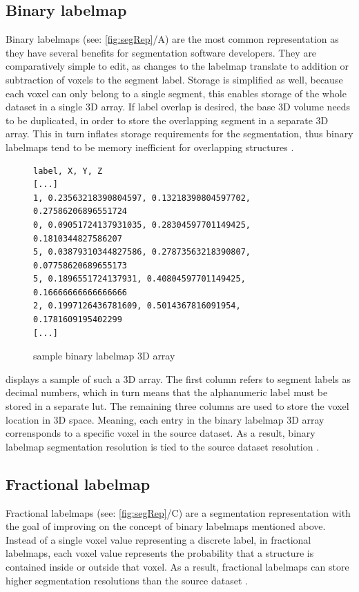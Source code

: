 \subsection{Binary labelmap}\label{s:b-binary-labelmap}
Binary labelmaps (see: \cref{fig:segRep}/A) are the most common representation as they have several benefits for segmentation software developers.
They are comparatively simple to edit, as changes to the labelmap translate to addition or subtraction of voxels to the segment label.
Storage is simplified as well, because each voxel can only belong to a single segment, this enables storage of the whole dataset in a single 3D array.
If label overlap is desired, the base 3D volume needs to be duplicated,
in order to store the overlapping segment in a separate 3D array.
This in turn inflates storage requirements for the segmentation,
thus binary labelmaps tend to be memory inefficient for overlapping structures \cite{slicercommunity3DSlicerImage2022}.
\begin{figure}[h]
	\begin{verbatim}
label, X, Y, Z
[...]
1, 0.23563218390804597, 0.13218390804597702, 0.27586206896551724
0, 0.09051724137931035, 0.28304597701149425, 0.1810344827586207
5, 0.03879310344827586, 0.27873563218390807, 0.07758620689655173
5, 0.1896551724137931, 0.40804597701149425, 0.16666666666666666
2, 0.1997126436781609, 0.5014367816091954, 0.1781609195402299
[...]
\end{verbatim}
	\caption{sample binary labelmap 3D array}\label{fig:binary-array}
\end{figure}

\noindent
{} displays a sample of such a 3D array.
The first column refers to segment labels as decimal numbers,
which in turn means that the alphanumeric label must be stored in a separate \acrfull{lut}.
The remaining three columns are used to store the voxel location in 3D space.
Meaning, each entry in the binary labelmap 3D array corrensponds to a specific voxel in the source dataset.
As a result, binary labelmap segmentation resolution is tied to the source dataset resolution \cite{pinterPolymorphSegmentationRepresentation2019,sunderlandFractionalLabelmapsComputing2017,weber3DSlicerPlatform2022}.


\subsection{Fractional labelmap}\label{s:b-fractional-labelmap}
Fractional labelmaps (see: \cref{fig:segRep}/C) are a segmentation representation with the goal of improving on the concept of binary labelmaps mentioned above.
Instead of a single voxel value representing a discrete label, in fractional labelmaps,
each voxel value represents the probability that a structure is contained inside or outside that voxel.
As a result, fractional labelmaps can store higher segmentation resolutions than the source dataset
\cite{warfieldFractionalSegmentationWhite1999,noePartialVolumeSegmentation2001,pinterPolymorphSegmentationRepresentation2019,sunderlandFractionalLabelmapsComputing2017,weber3DSlicerPlatform2022}.


